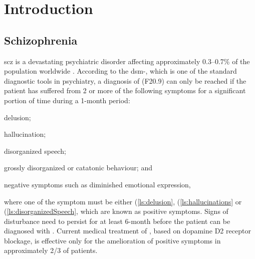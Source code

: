 	\chapter{Introduction}
	\section{Schizophrenia}
	\Gls{scz} is a devastating psychiatric disorder affecting approximately 0.3--0.7\% of the population worldwide \citep{AmericanPsychiatricAssociation2013}.
	According to the \gls{dsm}-, which is one of the standard diagnostic tools in psychiatry, a diagnosis of  (F20.9) can only be reached if the patient has suffered from 2 or more of the following symptoms for a significant portion of time during a 1-month period: 
	\begin{enumerate*}[label=\arabic*\upshape)]
		\item delusion; \label{ls:delusion}
		\item hallucination;\label{ls:hallucinations}
		\item disorganized speech;\label{ls:disorganizedSpeech}
		\item grossly disorganized or catatonic behaviour; and\label{ls:catatonicBehavior}
		\item negative symptoms such as diminished emotional expression,\label{ls:negativeSymptoms}
	\end{enumerate*}  where one of the symptom must be either (\ref{ls:delusion}, (\ref{ls:hallucinations} or (\ref{ls:disorganizedSpeech}, which are known as positive symptoms.
	Signs of disturbance need to persist for at least 6-month before the patient can be diagnosed with .
	Current medical treatment of , based on dopamine D2 receptor blockage, is effective only for the amelioration of positive symptoms in approximately 2/3 of patients.
	
